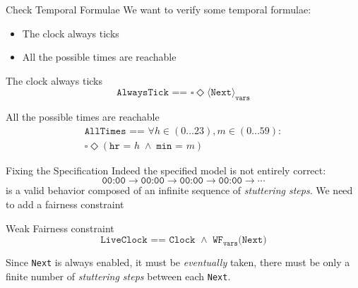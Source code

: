 \begin{frame}{Check Temporal Formulae}
    We want to verify some temporal formulae:
    \begin{itemize}
        \item The clock always ticks
        \item All the possible times are reachable
    \end{itemize}
    \pause
    \begin{block}{The clock always ticks}
        \[
            \texttt{AlwaysTick == } \square \Diamond \langle \texttt{Next} \rangle _{\texttt{vars}}
        \]
    \end{block}
    \pause
    \begin{block}{All the possible times are reachable}
        \begin{equation*}
            \begin{gathered}
                \texttt{AllTimes == } \forall h \in (0 \ldots 23), m \in (0 \ldots 59):\\
                \square \Diamond (\texttt{hr = } h\; \land\; \texttt{min = } m)
            \end{gathered}
        \end{equation*}
    \end{block}
    \demo
\end{frame}

\begin{frame}{Fixing the Specification}
    Indeed the specified model is not entirely correct:
    \[
        \texttt{00:00} \rightarrow \texttt{00:00} \rightarrow \texttt{00:00} \rightarrow \texttt{00:00} \rightarrow \cdots
    \]
    is a valid behavior composed of an infinite sequence of \emph{stuttering steps}.
    \pause
    We need to add a fairness constraint
    \begin{block}{Weak Fairness constraint}
        \[
            \texttt{LiveClock == Clock } \land \texttt{ WF}_{\texttt{vars}}\texttt{(Next)}
        \]

        Since \texttt{Next} is always enabled, it must be \emph{eventually} taken, there must be only a finite number of \emph{stuttering steps} between each \texttt{Next}.
    \end{block}
    \demo
\end{frame}
